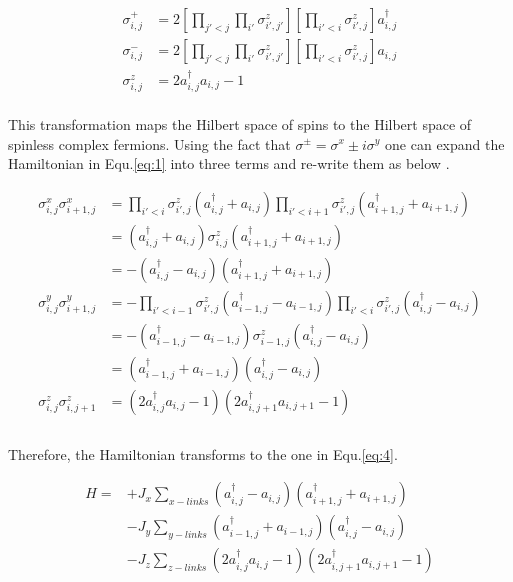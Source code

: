 \documentclass{article}
\begin{document}
\begin{equation}\label{eq:2}
	\begin{aligned}
		\sigma^{+}_{i,j} &= 2[\prod_{j'<j}\prod_{i'}\sigma^{z}_{i',j'}][\prod_{i'<i}\sigma^z_{i',j}] a^{\dagger}_{i,j}\\
		\sigma^{-}_{i,j} &= 2[\prod_{j'<j}\prod_{i'}\sigma^{z}_{i',j'}][\prod_{i'<i}\sigma^z_{i',j}] a_{i,j}\\
		\sigma^{z}_{i,j} &= 2a^{\dagger}_{i,j}a_{i,j} - 1
	\end{aligned}
\end{equation}\\

\noindent This transformation maps the Hilbert space of spins to the Hilbert space of spinless complex fermions. Using the fact that $ \sigma^{\pm} = \sigma^{x}\pm i\sigma^{y} $ one can expand the Hamiltonian in Equ.\hspace{0.2mm}\ref{eq:1} into three terms and re-write them as below \cite{Schmoll_2017}.


\begin{equation}\label{eq:3}
	\begin{aligned}
		\sigma^{x}_{i,j}\sigma^{x}_{i+1,j} &= \prod_{i'<i}\sigma^z_{i',j} (a^{\dagger}_{i,j} + a_{i,j}) \prod_{i'<i+1}\sigma^z_{i',j} (a^{\dagger}_{i+1,j} + a_{i+1,j})\\
		&= (a^{\dagger}_{i,j} + a_{i,j}) \sigma^z_{i,j} (a^{\dagger}_{i+1,j} + a_{i+1,j})\\
		&= -(a^{\dagger}_{i,j} - a_{i,j}) (a^{\dagger}_{i+1,j} + a_{i+1,j})\\
		\sigma^{y}_{i,j}\sigma^{y}_{i+1,j} &= -\prod_{i'<i-1}\sigma^z_{i',j} (a^{\dagger}_{i-1,j} - a_{i-1,j}) \prod_{i'<i}\sigma^z_{i',j} (a^{\dagger}_{i,j} - a_{i,j})\\
		&= -(a^{\dagger}_{i-1,j} - a_{i-1,j}) \sigma^z_{i-1,j} (a^{\dagger}_{i,j} - a_{i,j})\\
		&= (a^{\dagger}_{i-1,j} + a_{i-1,j}) (a^{\dagger}_{i,j} - a_{i,j})\\
		\sigma^{z}_{i,j}\sigma^{z}_{i,j+1} &=  (2a^{\dagger}_{i,j}a_{i,j} - 1) (2a^{\dagger}_{i,j+1}a_{i,j+1} - 1)\\
	\end{aligned}
\end{equation}\\

\noindent Therefore, the Hamiltonian transforms to the one in Equ.\hspace{0.2mm}\ref{eq:4}. 

\begin{equation}\label{eq:4}
	\begin{aligned}
		H= &+J_x \sum_{x-links} (a^{\dagger}_{i,j} - a_{i,j}) (a^{\dagger}_{i+1,j} + a_{i+1,j})\\
		&-J_y \sum_{y-links} (a^{\dagger}_{i-1,j} + a_{i-1,j}) (a^{\dagger}_{i,j} - a_{i,j})\\
		&-J_z \sum_{z-links} (2a^{\dagger}_{i,j}a_{i,j} - 1) (2a^{\dagger}_{i,j+1}a_{i,j+1} - 1)\\
	\end{aligned}
\end{equation}\\
\end{document}
